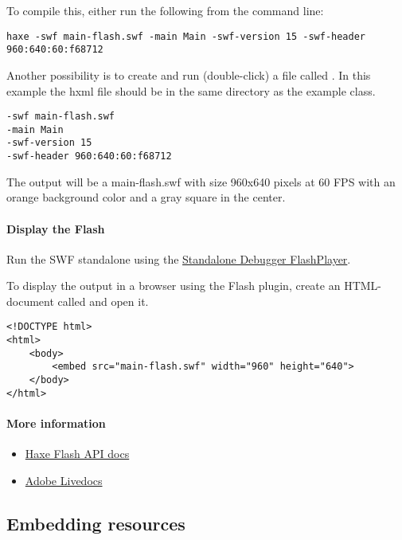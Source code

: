 To compile this, either run the following from the command line:

\begin{lstlisting}
haxe -swf main-flash.swf -main Main -swf-version 15 -swf-header 960:640:60:f68712
\end{lstlisting}

Another possibility is to create and run (double-click) a file called . In this example the hxml file should be in the same directory as the example class.

\begin{lstlisting}
-swf main-flash.swf
-main Main
-swf-version 15
-swf-header 960:640:60:f68712
\end{lstlisting}

The output will be a main-flash.swf with size 960x640 pixels at 60 FPS with an orange background color and a gray square in the center.

\paragraph{Display the Flash}

Run the SWF standalone using the \href{https://www.adobe.com/support/flashplayer/downloads.html}{Standalone Debugger FlashPlayer}.

To display the output in a browser using the Flash plugin, create an HTML-document called  and open it.

\begin{lstlisting}
<!DOCTYPE html>
<html>
	<body>
		<embed src="main-flash.swf" width="960" height="640">
	</body>
</html>
\end{lstlisting}

\paragraph{More information}

\begin{itemize}
	\item \href{http://api.haxe.org/flash/}{Haxe Flash API docs}
	\item \href{http://help.adobe.com/en_US/FlashPlatform/reference/actionscript/3/}{Adobe Livedocs}
\end{itemize}

\subsection{Embedding resources}
\label{target-flash-resources}

